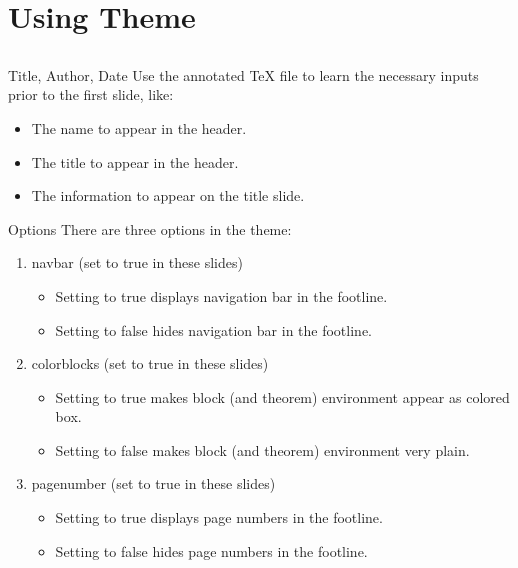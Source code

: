 \documentclass[serif]{beamer}
\begin{document}
\section{Using Theme}
\subsection*{}

\begin{frame}{Title, Author, Date}
Use the annotated TeX file to learn the necessary inputs prior to the first slide, like:
\begin{itemize}
\item The name to appear in the header.
\item The title to appear in the header.
\item The information to appear on the title slide.
\end{itemize}
\end{frame}

\begin{frame}{Options}
There are three options in the theme:
\begin{enumerate}
\item navbar (set to true in these slides)
\begin{itemize}
\item Setting to true displays navigation bar in the footline.
\item Setting to false hides navigation bar in the footline.
\end{itemize}
\item colorblocks (set to true in these slides)
\begin{itemize}
\item Setting to true makes block (and theorem) environment appear as colored box.
\item Setting to false makes block (and theorem) environment very plain.
\end{itemize}
\item pagenumber (set to true in these slides)
\begin{itemize}
\item Setting to true displays page numbers in the footline.
\item Setting to false hides page numbers in the footline.
\end{itemize}
\end{enumerate}
\end{frame}
\end{document}
